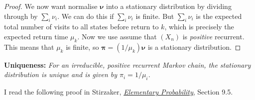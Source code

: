 \documentclass[
  a4paper,
]{article}
\theoremstyle{definition}
\theoremstyle{definition}
\theoremstyle{definition}
\theoremstyle{remark}
\begin{document}
\begin{proof}
We now want normalise \(\boldsymbol\nu\) into a stationary distribution by dividing through by \(\sum_i \nu_i\). We can do this if \(\sum_i \nu_i\) is finite. But \(\sum_i \nu_i\) is the expected total number of visits to all states before return to \(k\), which is precisely the expected return time \(\mu_k\). Now we use assume that \((X_n)\) is \emph{positive} recurrent. This means that \(\mu_k\) is finite, so \(\boldsymbol\pi = (1/\mu_k) \boldsymbol\nu\) is a stationary distribution.

\end{proof}

\textbf{Uniqueness:} \emph{For an irreducible, positive recurrent Markov chain, the stationary distribution is unique and is given by \(\pi_i = 1/\mu_i\).}

I read the following proof in Stirzaker, \href{https://leeds.primo.exlibrisgroup.com/permalink/44LEE_INST/13rlbcs/alma991013131349705181}{\emph{Elementary Probability}}, Section 9.5.
\end{document}
